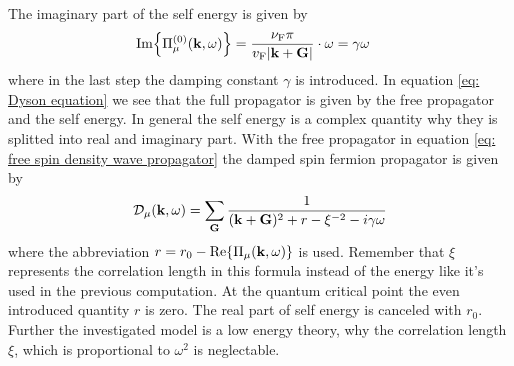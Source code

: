 The imaginary part of the self energy is given by
%
\begin{align}
	\Im{\Pi_{\mu}^{(0)}(\vb{k}, \omega)} &= \frac{\nu_{\mt{F}} \pi}{v_{\mt{F}} |\vb{k} + \vb{G}|} \cdot \omega = \gamma \omega		 
\end{align}
%
where in the last step the damping constant $\gamma$ is introduced.
In equation \eqref{eq: Dyson equation} we see that the full propagator is given by the free propagator and the self energy.
In general the self energy is a complex quantity why they is splitted into real and imaginary part.
With the free propagator in equation \eqref{eq: free spin density wave propagator} the damped spin fermion propagator is given by
%
\begin{align}
	\mathcal{D}_{\mu}(\vb{k}, \omega) = \sum\limits_{\vb{G}} \frac{1}{(\vb{k}+\vb{G})^{2} + r - \xi^{-2} - i \gamma \omega}
	\label{eq: damped spin density propagator with real omega}
\end{align}
%
where the abbreviation $r = r_{0} - \Re{\Pi_{\mu}(\vb{k}, \omega)}$ is used.
Remember that $\xi$ represents the correlation length in this formula instead of the energy like it's used in the previous computation.
At the quantum critical point the even introduced quantity $r$ is zero.
The real part of self energy is canceled with $r_{0}$.
Further the investigated model is a low energy theory, why the correlation length $\xi$, which is proportional to $\omega^{2}$ is neglectable.
%
%
